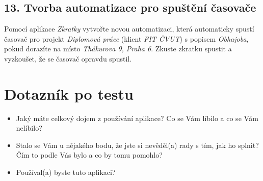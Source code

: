 \subsection*{13. Tvorba automatizace pro spuštění časovače}

Pomocí aplikace \emph{Zkratky} vytvořte novou automatizaci, která automaticky spustí časovač pro projekt \emph{Diplomová práce} (klient \emph{FIT ČVUT}) s popisem \emph{Obhajoba}, pokud dorazíte na místo \emph{Thákurova 9, Praha 6}. Zkuste zkratku spustit a vyzkoušet, že se časovač opravdu spustil.

\section*{Dotazník po testu}
\begin{itemize}
\item Jaký máte celkový dojem z používání aplikace? Co se Vám líbilo a co se Vám nelíbilo?
\item Stalo se Vám u nějakého bodu, že jste si nevěděl(a) rady s tím, jak ho splnit? Čím to podle Vás bylo a co by tomu pomohlo?
\item Používal(a) byste tuto aplikaci?
\end{itemize}
